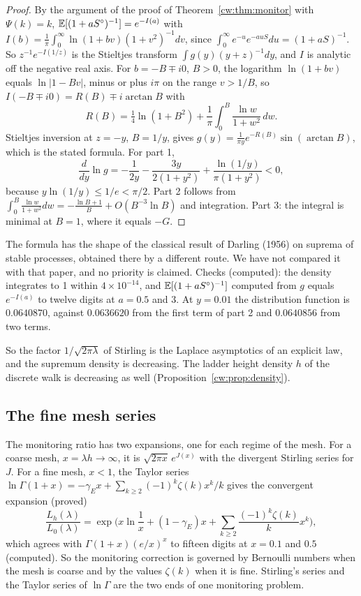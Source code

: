 \begin{proof}
By the argument of the proof of Theorem~\ref{cw:thm:monitor} with $\Psi(k)=k$, $\mathbb{E}[(1+aS^\circ)^{-1}]=e^{-I(a)}$ with $I(b)=\frac1\pi\int_0^\infty\ln(1+bv)(1+v^2)^{-1}dv$, since $\int_0^\infty e^{-u}e^{-auS}du=(1+aS)^{-1}$. So $z^{-1}e^{-I(1/z)}$ is the Stieltjes transform $\int g(y)(y+z)^{-1}dy$, and $I$ is analytic off the negative real axis. For $b=-B\mp i0$, $B>0$, the logarithm $\ln(1+bv)$ equals $\ln|1-Bv|$, minus or plus $i\pi$ on the range $v>1/B$, so $I(-B\mp i0)=R(B)\mp i\arctan B$ with
\[
R(B)=\tfrac14\ln(1+B^2)+\frac1\pi\int_0^B\frac{\ln w}{1+w^2}\,dw .
\]
Stieltjes inversion at $z=-y$, $B=1/y$, gives $g(y)=\frac1{\pi y}e^{-R(B)}\sin(\arctan B)$, which is the stated formula. For part 1,
\[
\frac{d}{dy}\ln g=-\frac1{2y}-\frac{3y}{2(1+y^2)}+\frac{\ln(1/y)}{\pi(1+y^2)}<0,
\]
because $y\ln(1/y)\le1/e<\pi/2$. Part 2 follows from $\int_0^B\frac{\ln w}{1+w^2}dw=-\frac{\ln B+1}B+O(B^{-3}\ln B)$ and integration. Part 3: the integral is minimal at $B=1$, where it equals $-G$.
\end{proof}

The formula has the shape of the classical result of Darling (1956) on suprema of stable processes, obtained there by a different route. We have not compared it with that paper, and no priority is claimed. Checks (computed): the density integrates to 1 within $4\times10^{-14}$, and $\mathbb{E}[(1+aS^\circ)^{-1}]$ computed from $g$ equals $e^{-I(a)}$ to twelve digits at $a=0.5$ and $3$. At $y=0.01$ the distribution function is $0.0640870$, against $0.0636620$ from the first term of part 2 and $0.0640856$ from two terms.

So the factor $1/\sqrt{2\pi\lambda}$ of Stirling is the Laplace asymptotics of an explicit law, and the supremum density is decreasing. The ladder height density $h$ of the discrete walk is decreasing as well (Proposition~\ref{cw:prop:density}).

\subsection{The fine mesh series}
The monitoring ratio has two expansions, one for each regime of the mesh. For a coarse mesh, $x=\lambda h\to\infty$, it is $\sqrt{2\pi x}\,e^{J(x)}$ with the divergent Stirling series for $J$. For a fine mesh, $x<1$, the Taylor series $\ln\Gamma(1+x)=-\gamma_Ex+\sum_{k\ge2}(-1)^k\zeta(k)x^k/k$ gives the convergent expansion (proved)
\begin{equation}\label{cw:eq:finemesh}
\frac{L_h(\lambda)}{L_0(\lambda)}=\exp\Big(x\ln\frac1x+(1-\gamma_E)x+\sum_{k\ge2}\frac{(-1)^k\zeta(k)}kx^k\Big),
\end{equation}
which agrees with $\Gamma(1+x)(e/x)^x$ to fifteen digits at $x=0.1$ and $0.5$ (computed). So the monitoring correction is governed by Bernoulli numbers when the mesh is coarse and by the values $\zeta(k)$ when it is fine. Stirling's series and the Taylor series of $\ln\Gamma$ are the two ends of one monitoring problem.

